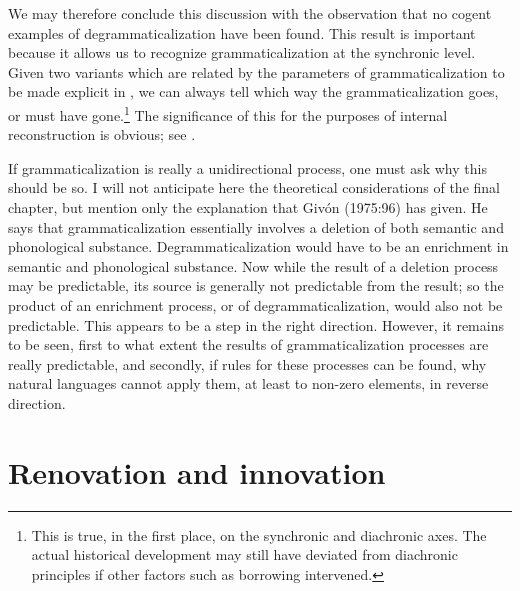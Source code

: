We may therefore conclude this discussion with the observation that no cogent examples of degrammaticalization have been found. This result is important because it allows us to recognize grammaticalization at the synchronic level. Given two variants which are related by the parameters of grammaticalization to be made explicit in , we can always tell which way the grammaticalization goes, or must have gone.\footnote{This is true, in the first place, on the synchronic and diachronic axes. The actual historical development may still have deviated from diachronic principles if other factors such as borrowing intervened.} The significance of this for the purposes of internal reconstruction is obvious; see .

If grammaticalization is really a unidirectional process, one must ask why this should be so. I will not anticipate here the theoretical considerations of the final chapter, but mention only the explanation that Givón (1975:96) has given. He says that grammaticalization essentially involves a deletion of both semantic and phonological substance. Degrammaticalization would have to be an enrichment in semantic and phonological substance. Now while the result of a deletion process may be predictable, its source is generally not predictable from the result; so the product of an enrichment process, or of degrammaticalization, would also not be predictable. This appears to be a step in the right direction. However, it remains to be seen, first to what extent the results of grammaticalization processes are really predictable, and secondly, if rules for these processes can be found, why natural languages cannot apply them, at least to non-zero elements, in reverse direction.

\section{Renovation and innovation}


